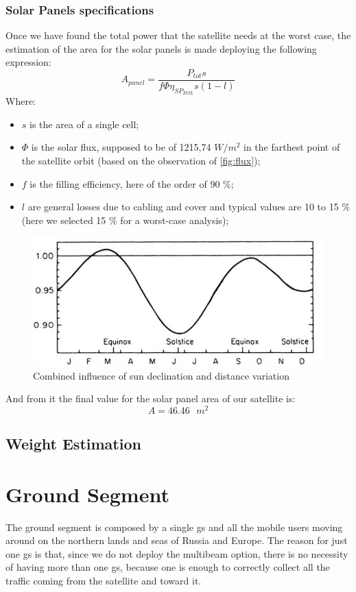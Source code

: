 \documentclass[11pt,a4paper,titlepage]{article}
\begin{document}
		\subsubsection{Solar Panels specifications}
			Once we have found the total power that the satellite needs at the worst case, the estimation of the area for the solar panels is made deploying the following expression:
\begin{equation}
A_{panel} = \frac{P_{tot} s}{f \Phi \eta_{SP_{EOL}} s (1 - l)}
\end{equation}
Where:
\begin{itemize}
\item $s$ is the area of a single cell;
\item $\Phi$ is the solar flux, supposed to be of 1215,74 $W/m^2$ in the farthest point of the satellite orbit (based on the observation of \autoref{fig:flux});
\item $f$ is the filling efficiency, here of the order of 90 \%;
\item $l$ are general losses due to cabling and cover and typical values are 10 to 15 \% (here we selected 15 \% for a worst-case analysis);
\end{itemize}
\begin{figure}[h]
\centering
\includegraphics[width = .7\textwidth]{flux.png}
\caption{Combined influence of sun declination and distance variation}
\label{fig:flux}
\end{figure}
And from it the final value for the solar panel area of our satellite is:
\begin{equation}
A = 46.46 \text{ $m^2$}
\end{equation}
	\subsection{Weight Estimation}
		\lipsum[1]
\section{Ground Segment}
	The ground segment is composed by a single \gls{gs} and all the mobile users moving around on the northern lands and 		seas of Russia and Europe. The reason for just one \gls{gs} is that, since we do not deploy the multibeam option, there is no 		necessity of having more than one \gls{gs}, because one is enough to correctly collect all the traffic coming from the satellite 		and toward it.
\end{document}
